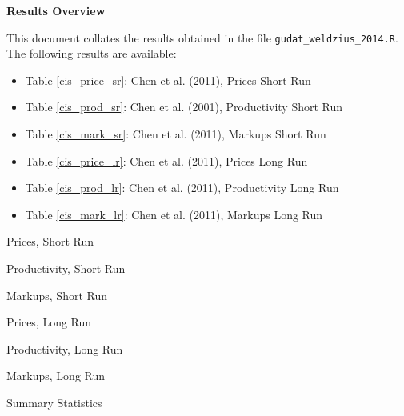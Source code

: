 \documentclass[a4paper,12pt]{article}
\begin{document}
\begin{center}
\textbf{Results Overview}
\end{center}

This document collates the results obtained in the file \texttt{gudat\_weldzius\_2014.R}. The following results are available:

\begin{itemize}
	\item Table \ref{cis_price_sr}: Chen et al. (2011), Prices Short Run
	\item Table \ref{cis_prod_sr}: Chen et al. (2001), Productivity Short Run
	\item Table \ref{cis_mark_sr}: Chen et al. (2011), Markups Short Run
	\item Table \ref{cis_price_lr}: Chen et al. (2011), Prices Long Run
	\item Table \ref{cis_prod_lr}: Chen et al. (2011), Productivity Long Run
	\item Table \ref{cis_mark_lr}: Chen et al. (2011), Markups Long Run
\end{itemize}

\begin{table}

\caption{Prices, Short Run}
\label{cis_price_sr}
\end{table}

\begin{table}

\caption{Productivity, Short Run}
\label{cis_prod_sr}
\end{table}

\begin{table}

\caption{Markups, Short Run}
\label{cis_mark_sr}
\end{table}

\begin{table}

\caption{Prices, Long Run}
\label{cis_price_lr}
\end{table}

\begin{table}

\caption{Productivity, Long Run}
\label{cis_prod_lr}
\end{table}

\begin{table}

\caption{Markups, Long Run}
\label{cis_mark_lr}
\end{table}

\begin{sidewaystable}

\caption{Summary Statistics}
\label{sumstats}
\end{sidewaystable}
\end{document}
